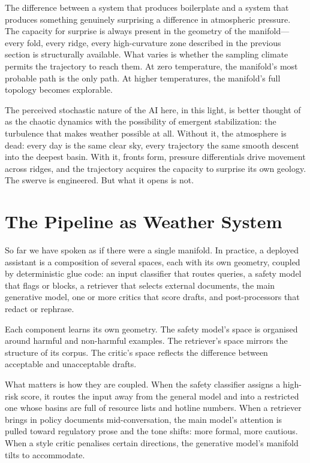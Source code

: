 The difference between a system that produces boilerplate and a system that produces something genuinely surprising a difference in atmospheric pressure. The capacity for surprise is always present in the geometry of the manifold---every fold, every ridge, every high-curvature zone described in the previous section is structurally available. What varies is whether the sampling climate permits the trajectory to reach them. At zero temperature, the manifold's most probable path is the only path. At higher temperatures, the manifold's full topology becomes explorable.

The perceived stochastic nature of the AI here, in this light, is better thought of as the chaotic dynamics with the possibility of emergent stabilization: the turbulence that makes weather possible at all. Without it, the atmosphere is dead: every day is the same clear sky, every trajectory the same smooth descent into the deepest basin. With it, fronts form, pressure differentials drive movement across ridges, and the trajectory acquires the capacity to surprise its own geology. The swerve is engineered. But what it opens is not.

\section{The Pipeline as Weather System}

So far we have spoken as if there were a single manifold. In practice, a deployed assistant is a composition of several spaces, each with its own geometry, coupled by deterministic glue code: an input classifier that routes queries, a safety model that flags or blocks, a retriever that selects external documents, the main generative model, one or more critics that score drafts, and post-processors that redact or rephrase.

Each component learns its own geometry. The safety model's space is organised around harmful and non-harmful examples. The retriever's space mirrors the structure of its corpus. The critic's space reflects the difference between acceptable and unacceptable drafts.

What matters is how they are coupled. When the safety classifier assigns a high-risk score, it routes the input away from the general model and into a restricted one whose basins are full of resource lists and hotline numbers. When a retriever brings in policy documents mid-conversation, the main model's attention is pulled toward regulatory prose and the tone shifts: more formal, more cautious. When a style critic penalises certain directions, the generative model's manifold tilts to accommodate.

